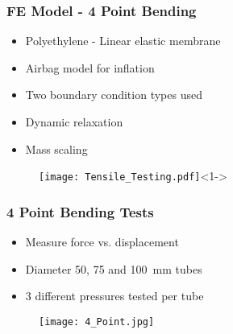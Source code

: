 \documentclass[serif, pdf]{beamer}
\begin{document}



\begin{frame}
\frametitle{FE Model - 4 Point Bending}
\begin{minipage}{0.60\textwidth}
\begin{itemize}
\item<1-> Polyethylene - Linear elastic membrane
\item<2-> Airbag model for inflation 
\item<3-> Two boundary condition types used
\item<4-> Dynamic relaxation
\item<5-> Mass scaling
\end{itemize}
\end{minipage}
\begin{minipage}{0.35\textwidth}
\begin{figure}
\texttt{[image: Tensile\_Testing.pdf]}<1->
\end{figure}
\end{minipage}


\end{frame}


\begin{frame}
\frametitle{4 Point Bending Tests}
\begin{itemize}
\item<1-> Measure force vs. displacement
\item<2-> Diameter 50, 75 and 100~mm tubes
\item<3-> 3 different pressures tested per tube
\end{itemize}
\begin{figure}
\texttt{[image: 4\_Point.jpg]}
\end{figure}
\end{frame}
\end{document}
